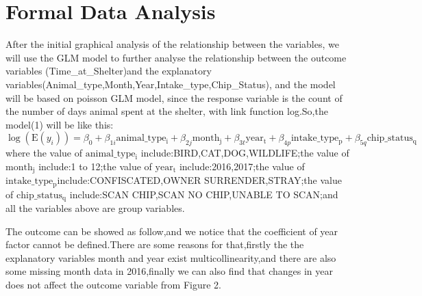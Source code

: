 \documentclass[
]{article}
\begin{document}
\hypertarget{formal-data-analysis}{%
\section{Formal Data Analysis}\label{formal-data-analysis}}

After the initial graphical analysis of the relationship between the
variables, we will use the GLM model to further analyse the relationship
between the outcome variables (Time\_at\_Shelter)and the explanatory
variables(Animal\_type,Month,Year,Intake\_type,Chip\_Status), and the
model will be based on poisson GLM model, since the response variable is
the count of the number of days animal spent at the shelter, with link
function log.So,the model(1) will be like this: \[
\log(\mathrm{E}(y_i)) = \beta_0 + \beta_{1i} \mathrm{animal\_type_i} + \beta_{2j} \mathrm{month_j} + \beta_{3t} \mathrm{year_t} + \beta_{4p} \mathrm{intake\_type_p} + \beta_{5q} \mathrm{chip\_status_q}
\] where the value of \(\mathrm{animal\_type_i}\)
include:BIRD,CAT,DOG,WILDLIFE;the value of \(\mathrm{month_j}\)
include:1 to 12;the value of \(\mathrm{year_t}\) include:2016,2017;the
value of \(\mathrm{intake\_type_p}\)include:CONFISCATED,OWNER
SURRENDER,STRAY;the value of \(\mathrm{chip\_status_q}\) include:SCAN
CHIP,SCAN NO CHIP,UNABLE TO SCAN;and all the variables above are group
variables.

The outcome can be showed as follow,and we notice that the coefficient
of year factor cannot be defined.There are some reasons for that,firstly
the the explanatory variables month and year exist multicollinearity,and
there are also some missing month data in 2016,finally we can also find
that changes in year does not affect the outcome variable from Figure 2.
\end{document}
